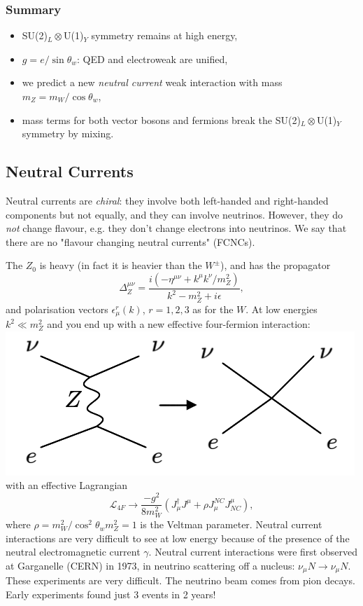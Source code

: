 \subsubsection{Summary}
%
\begin{itemize}
\item SU(2)$_L \otimes$U(1)$_Y$ symmetry remains at high energy,
\item $g = e/\sin\theta_w$: QED and electroweak are unified,
\item we predict a new \textit{neutral current} weak interaction with mass $m_Z = m_W/\cos\theta_w$,
\item mass terms for both vector bosons and fermions break the SU(2)$_L \otimes$U(1)$_Y$ symmetry by mixing.
\end{itemize}
%
\subsection{Neutral Currents}
%
Neutral currents are \textit{chiral}: they involve both left-handed and right-handed components but not equally, and they can involve neutrinos. However, they do \textit{not} change flavour, e.g. they don't change electrons into neutrinos. We say that there are no "flavour changing neutral currents" (FCNCs). 

The $Z_0$ is heavy (in fact it is heavier than the $W^\pm$), and has the propagator
\begin{equation}
\Delta_Z^{\mu \nu} = \frac{i(-\eta^{\mu \nu} + k^\mu k^\nu/m_Z^2)}{k^2 - m_Z^2 + i \epsilon},
\end{equation}
and polarisation vectors $\epsilon_\mu^r(k)$, $r=1,2,3$ as for the $W$. At low energies $k^2 \ll m_Z^2$ and you end up with a new effective four-fermion interaction:
\newline
  \includegraphics[width=0.6\linewidth]{figs/24a.png}
\newline
with an effective Lagrangian
\begin{equation}
\mathcal{L}_{4F} \to \frac{-g^2}{8m_W^2}(J_\mu^\dagger J^\mu + \rho J_\mu^{NC}J^\mu_{NC}),
\end{equation}
where $\rho = m_W^2/\cos^2\theta_w m_Z^2 =1$ is the Veltman parameter. Neutral current interactions are very difficult to see at low energy because of the  presence of the neutral electromagnetic current $\gamma$. Neutral current interactions were first observed at Garganelle (CERN) in 1973, in neutrino scattering off a nucleus: $\nu_\mu N \to \nu_\mu N$. These experiments are very difficult. The neutrino beam comes from pion decays. Early experiments found just 3 events in 2 years!
%
